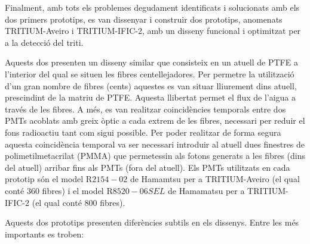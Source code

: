 Finalment, amb tots els problemes degudament identificats i solucionats amb els dos primers prototips, es van dissenyar i construir dos prototips, anomenats TRITIUM-Aveiro i TRITIUM-IFIC-2, amb un disseny funcional i optimitzat per a la detecció del triti. 

Aquests dos presenten un disseny similar que consisteix en un atuell de PTFE a l'interior del qual se situen les fibres centellejadores. Per permetre la utilització d'un gran nombre de fibres (cents) aquestes es van situar lliurement dins atuell, prescindint de la matriu de PTFE. Aquesta llibertat permet el flux de l'aigua a través de les fibres. A més, es van realitzar coincidències temporals entre dos PMTs acoblats amb greix òptic a cada extrem de les fibres, necessari per reduir el fons radioactiu tant com sigui possible. Per poder realitzar de forma segura aquesta coincidència temporal va ser necessari introduir al atuell dues finestres de polimetilmetacrilat (PMMA) que permetessin als fotons generats a les fibres (dins del atuell) arribar fins als PMTs (fora del atuell). Els PMTs utilitzats en cada prototip són el model R$2154-02$ de Hamamtsu \cite{DataSheetPMTsAveiro} per a TRITIUM-Aveiro (el qual conté 360 fibres) i el model R$8520-06SEL$ de Hamamatsu \cite{DataSheetPMTs} per a TRITIUM-IFIC-2 (el qual conté 800 fibres).

Aquests dos prototips presenten diferències subtils en els dissenys. Entre les més importants es troben:

